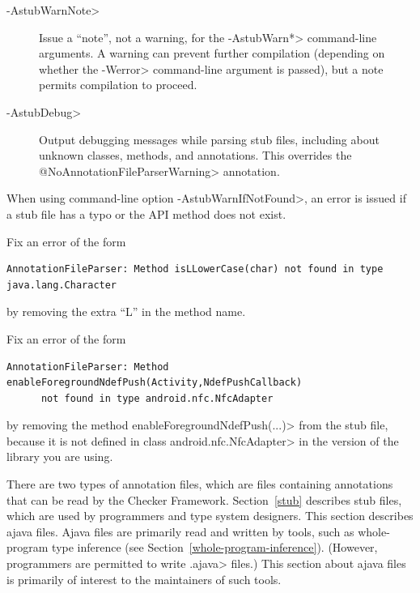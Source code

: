 \begin{description}
\item[\<-AstubWarnNote>]
  Issue a ``note'', not a warning, for the \<-AstubWarn*> command-line
  arguments.  A warning can prevent further compilation (depending on
  whether the \<-Werror> command-line argument is passed), but a note permits
  compilation to proceed.

\item[\<-AstubDebug>]
  Output debugging messages while parsing stub files, including about
  unknown classes, methods, and annotations.  This overrides the
  \<@NoAnnotationFileParserWarning> annotation.

\end{description}



When using command-line option \<-AstubWarnIfNotFound>,
an error is issued if a stub file has a typo or the API method does not
exist.

Fix an error of the form
\begin{Verbatim}
AnnotationFileParser: Method isLLowerCase(char) not found in type java.lang.Character
\end{Verbatim}

\noindent
by removing the extra ``L'' in the method name.

Fix an error of the form
\begin{Verbatim}
AnnotationFileParser: Method enableForegroundNdefPush(Activity,NdefPushCallback)
      not found in type android.nfc.NfcAdapter
\end{Verbatim}

\noindent
by removing the method \<enableForegroundNdefPush(...)> from
the stub file, because it is not defined in class \<android.nfc.NfcAdapter>
in the version of the library you are using.



There are two types of annotation files, which are files containing annotations that
can be read by the Checker Framework.
Section~\ref{stub} describes stub files, which are used by programmers and
type system designers.
This section describes ajava files.
Ajava files are primarily read and written by tools, such as whole-program type
inference (see Section~\ref{whole-program-inference}).  (However,
programmers are permitted to write \<.ajava> files.)
This section about
ajava files is primarily of interest to the maintainers of such tools.

